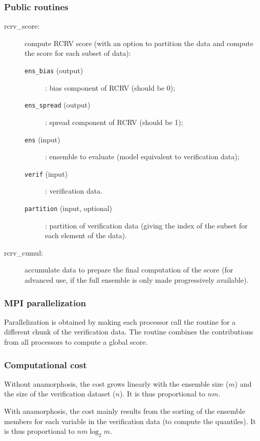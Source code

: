 \documentclass[11pt]{article}
\begin{document}
\subsubsection*{Public routines}

\begin{description}
\item[rcrv\_score:] compute RCRV score (with an option to partition the data
                    and compute the score for each subset of data):
  \begin{description}
  \item[{\tt ens\_bias} (output)]: bias component of RCRV (should be 0);
  \item[{\tt ens\_spread} (output)]: spread component of RCRV (should be 1);
  \item[{\tt ens} (input)]: ensemble to evaluate (model equivalent to verification data);
  \item[{\tt verif} (input)]: verification data.
  \item[{\tt partition} (input, optional)]: partition of verification data
                                  (giving the index of the subset for each element of the data).
  \end{description}
\item[rcrv\_cumul:] accumulate data to prepare the final computation of the score
                    (for advanced use, if the full ensemble is only made progressively available).
\end{description}

\subsubsection*{MPI parallelization}

Parallelization is obtained by making each processor call the routine
for a different chunk of the verification data.
The routine combines the contributions from all processors
to compute a global score.

\subsubsection*{Computational cost}

Without anamorphosis, the cost grows linearly with the ensemble size ($m$)
and the size of the verification dataset ($n$).
It is thus proportional to $n m$.

\noindent
With anamorphosis, the cost mainly results from the sorting of the ensemble members
for each variable in the verification data (to compute the quantiles).
It is thus proportional to $n m \log_2 m$.
\end{document}
